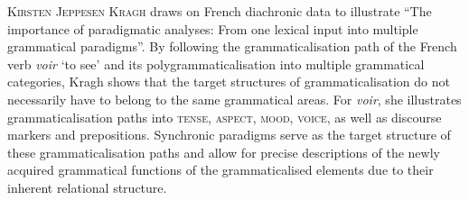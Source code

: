 \documentclass[output=paper]{langsci/langscibook}
\begin{document}
\textsc{Kirsten} \textsc{Jeppesen} \textsc{Kragh} draws on French diachronic data to illustrate “The importance of paradigmatic analyses: From one lexical input into multiple grammatical paradigms”. By following the grammaticalisation path of the French verb \textit{voir} ‘to see’ and its polygrammaticalisation into multiple grammatical categories, Kragh shows that the target structures of grammaticalisation do not necessarily have to belong to the same grammatical areas. For \textit{voir}, she illustrates grammaticalisation paths into \textsc{tense,} \textsc{aspect,} \textsc{mood,} \textsc{voice,} as well as discourse markers and prepositions. Synchronic paradigms serve as the target structure of these grammaticalisation paths and allow for precise descriptions of the newly acquired grammatical functions of the grammaticalised elements due to their inherent relational structure. 

\begin{verbatim}
    
\end{verbatim}
{\sloppy\printbibliography[heading=subbibliography]}
\end{document}
